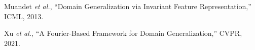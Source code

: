 
\begin{thebibliography}{9}
Muandet \textit{et al.}, “Domain Generalization via Invariant Feature Representation,” ICML, 2013.

Xu \textit{et al.}, “A Fourier‐Based Framework for Domain Generalization,” CVPR, 2021.
\end{thebibliography}
